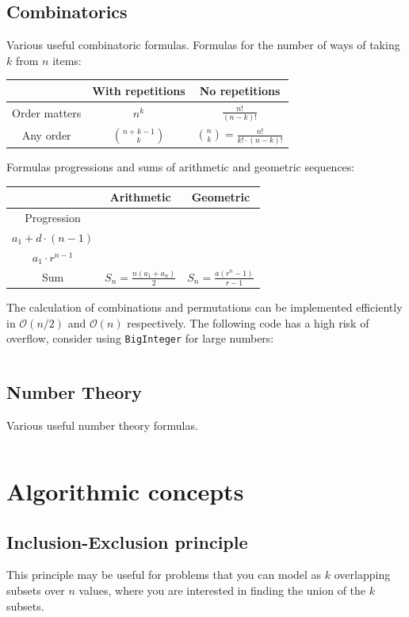 \documentclass[8pt,a4paper,landscape,oneside]{amsart}
\newcommand{\code}[1]{\inputminted[fontsize=\normalsize,baselinestretch=1]{java}{code/#1}}
\newcommand{\bigO}{\mathcal{O}}
\begin{document}
\begin{multicols*}{3}
  \subsection{Combinatorics}
  Various useful combinatoric formulas.
  Formulas for the number of ways of taking $k$ from $n$ items:
  \begin{center}
  \begin{tabular}{|c|c|c|} \hline
  & With repetitions & No repetitions \\
  \hline
  Order matters & $n^k$ & $\frac{n!}{(n-k)!}$ \\ \hline
  Any order & $\binom{n+k-1}{k}$ & $\binom{n}{k} = \frac{n!}{k!\cdot(n-k)!}$ \\ \hline
  \end{tabular}
  \end{center}
  Formulas progressions and sums of arithmetic and geometric sequences:
  \begin{center}
  \begin{tabular}{|c|c|c|} \hline
  & Arithmetic & Geometric \\
  \hline
  Progression & \shortstack{$a_n = a_{n-1} + d =$ \\ $a_1 + d\cdot(n-1)$} & \shortstack{$a_n = a_{n-1}\cdot r =$ \\ $a_1\cdot r^{n-1}$} \\ \hline
  Sum & $S_n = \frac{n(a_1+a_n)}{2}$ & $S_n = \frac{a(r^n-1)}{r-1}$ \\ \hline
  \end{tabular}
  \end{center}
  
  The calculation of combinations and permutations can be implemented efficiently in $\bigO(n/2)$ and $\bigO(n)$ respectively. The following code has a high risk of overflow, consider using \texttt{BigInteger} for large numbers:
  \code{Math/Combinatorics.java}
  
  \subsection{Number Theory}
  Various useful number theory formulas.
  \code{Math/Gcd.java}


\section{Algorithmic concepts}
  \subsection{Inclusion-Exclusion principle}
  This principle may be useful for problems that you can model as $k$ overlapping subsets over $n$ values, where you are interested in finding the union of the $k$ subsets.
  

\end{multicols*}
\end{document}
